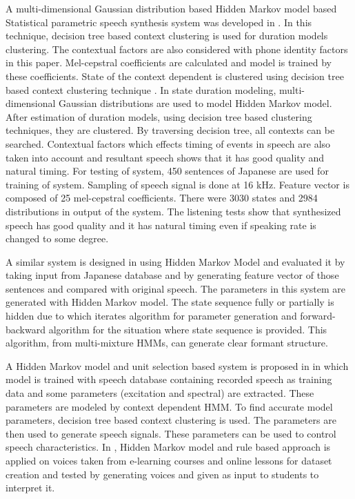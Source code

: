 A multi-dimensional Gaussian distribution based Hidden Markov model based Statistical parametric speech synthesis system was developed in
\cite{yoshimura1998duration}.  In this technique, decision tree based context clustering is used for duration models clustering. The contextual factors are also considered with phone identity factors in this paper. Mel-cepstral coefficients are
calculated and model is trained by these coefficients. State of the context dependent is clustered using decision tree based
context clustering technique \cite{odellj.j1995}. In state duration modeling, multi-dimensional Gaussian distributions are
used to model Hidden Markov model. After estimation of duration models, using decision tree based clustering techniques,
they are clustered. By traversing decision tree, all contexts can be searched. Contextual factors which effects timing of
events in speech are also taken into account and resultant speech shows that it has good quality and natural timing. For testing
of system, 450 sentences of Japanese are used for training of system. Sampling of speech signal is done at 16 kHz. Feature
vector is composed of 25 mel-cepstral coefficients. There were 3030 states and 2984 distributions in output of the system.
The listening tests show that synthesized speech has good quality and it has natural timing even if speaking rate is changed to
some degree.

A similar system is designed in \cite{tokuda2000speech} using Hidden Markov Model and evaluated it by taking input
from Japanese database and by generating feature vector of those sentences and compared with
original speech. The parameters in this system are generated with Hidden
Markov model. The state sequence fully or partially is hidden due to which iterates algorithm for parameter generation and
forward-backward algorithm for the situation where state sequence is provided. This algorithm, from multi-mixture HMMs,
can generate clear formant structure.


A Hidden Markov model and unit selection based system is proposed in \cite{tokuda2002hmm} in which model is trained with speech database containing 
recorded speech as training data and some parameters (excitation and spectral) are extracted. These parameters are modeled by context dependent HMM. To find
accurate model parameters, decision tree based context clustering is used. The parameters are then used to generate speech
signals. These parameters can be used to control speech characteristics. In \cite{harashima2006review}, Hidden Markov model and rule based approach is applied 
on voices taken from e-learning courses and online lessons for dataset creation and tested by
generating voices and given as input to students to interpret it.



